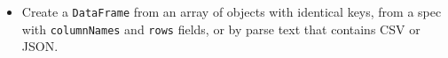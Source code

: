 \begin{itemize}
\item
  Create a \texttt{DataFrame} from an array of objects with identical keys,
  from a spec with \texttt{columnNames} and \texttt{rows} fields,
  or by parse text that contains CSV or JSON.
\end{itemize}
